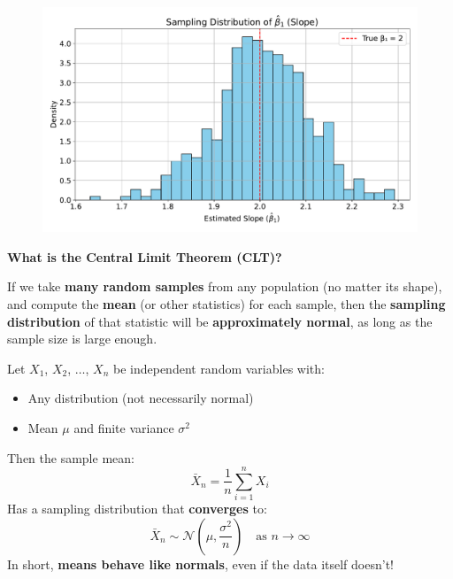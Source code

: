 \begin{figure}[!htp]
    \centering
    \includegraphics[width=\textwidth]{img/linear-regression/sampling-distribution.pdf}
\end{figure}

\newpage

\begin{flushleft}
    \textcolor{Green3}{ \textbf{What is the Central Limit Theorem (CLT)?}}
\end{flushleft}
If we take \textbf{many random samples} from any population (no matter its shape), and compute the \textbf{mean} (or other statistics) for each sample, then the \textbf{sampling distribution} of that statistic will be \textbf{approximately normal}, as long as the sample size is large enough.

\highspace
\begin{theorem}
    Let $X_1$, $X_2$, $\dots$, $X_n$ be independent random variables with:
    \begin{itemize}
        \item Any distribution (not necessarily normal)
        \item Mean $\mu$ and finite variance $\sigma^{2}$
    \end{itemize}
    Then the sample mean:
    \begin{equation*}
        \bar{X}_n = \dfrac{1}{n} \displaystyle\sum_{i=1}^{n} X_i
    \end{equation*}
    Has a sampling distribution that \textbf{converges} to:
    \begin{equation*}
        \bar{X}_n \sim \mathcal{N}\left( \mu, \frac{\sigma^2}{n} \right) \quad \text{as } n \to \infty
    \end{equation*}
    In short, \textbf{means behave like normals}, even if the data itself doesn't!
\end{theorem}


